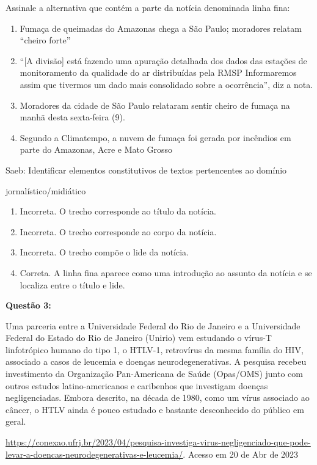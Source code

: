 {Assinale a alternativa que contém a parte da notícia denominada linha
fina:

\begin{enumerate}
\def\labelenumi{\alph{enumi})}
\item
  Fumaça de queimadas do Amazonas chega a São Paulo; moradores relatam
  ``cheiro forte''
\item
  ``{[}A divisão{]} está fazendo uma apuração detalhada dos dados das
  estações de monitoramento da qualidade do ar distribuídas pela RMSP
  Informaremos assim que tivermos um dado mais consolidado sobre a
  ocorrência'', diz a nota.
\item
  Moradores da cidade de São Paulo relataram sentir cheiro de fumaça na
  manhã desta sexta-feira (9).
\item
  Segundo a Climatempo, a nuvem de fumaça foi gerada por incêndios em
  parte do Amazonas, Acre e Mato Grosso
\end{enumerate}

Saeb: Identificar elementos constitutivos de textos pertencentes ao
domínio

jornalístico/midiático

\begin{enumerate}
\def\labelenumi{\arabic{enumi}.}
\item
  Incorreta. O trecho corresponde ao título da notícia.
\item
  Incorreta. O trecho corresponde ao corpo da notícia.
\item
  Incorreta. O trecho compõe o lide da notícia.
\item
  Correta. A linha fina aparece como uma introdução ao assunto da
  notícia e se localiza entre o título e lide.
\end{enumerate}

\textbf{Questão 3:}

Uma parceria entre a Universidade Federal do Rio de Janeiro e a
Universidade Federal do Estado do Rio de Janeiro (Unirio) vem estudando
o vírus-T linfotrópico humano do tipo 1, o HTLV-1, retrovírus da mesma
família do HIV, associado a casos de leucemia e doenças
neurodegenerativas. A pesquisa recebeu investimento da Organização
Pan-Americana de Saúde (Opas/OMS) junto com outros estudos
latino-americanos e caribenhos que investigam doenças negligenciadas.
Embora descrito, na década de 1980, como um vírus associado ao câncer, o
HTLV ainda é pouco estudado e bastante desconhecido do público em geral.

\href{https://conexao.ufrj.br/2023/04/pesquisa-investiga-virus-negligenciado-que-pode-levar-a-doencas-neurodegenerativas-e-leucemia/}{\uline{https://conexao.ufrj.br/2023/04/pesquisa-investiga-virus-negligenciado-que-pode-levar-a-doencas-neurodegenerativas-e-leucemia/}}.
Acesso em 20 de Abr de 2023

}
